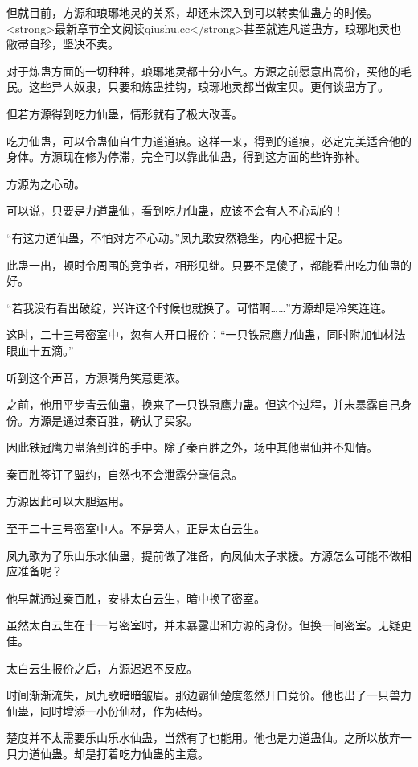 
\begin{this_body}

但就目前，方源和琅琊地灵的关系，却还未深入到可以转卖仙蛊方的时候。<strong>最新章节全文阅读qiushu.cc</strong>甚至就连凡道蛊方，琅琊地灵也敝帚自珍，坚决不卖。

对于炼蛊方面的一切种种，琅琊地灵都十分小气。方源之前愿意出高价，买他的毛民。这些异人奴隶，只要和炼蛊挂钩，琅琊地灵都当做宝贝。更何谈蛊方了。

但若方源得到吃力仙蛊，情形就有了极大改善。

吃力仙蛊，可以令蛊仙自生力道道痕。这样一来，得到的道痕，必定完美适合他的身体。方源现在修为停滞，完全可以靠此仙蛊，得到这方面的些许弥补。

方源为之心动。

可以说，只要是力道蛊仙，看到吃力仙蛊，应该不会有人不心动的！

“有这力道仙蛊，不怕对方不心动。”凤九歌安然稳坐，内心把握十足。

此蛊一出，顿时令周围的竞争者，相形见绌。只要不是傻子，都能看出吃力仙蛊的好。

“若我没有看出破绽，兴许这个时候也就换了。可惜啊……”方源却是冷笑连连。

这时，二十三号密室中，忽有人开口报价：“一只铁冠鹰力仙蛊，同时附加仙材法眼血十五滴。”

听到这个声音，方源嘴角笑意更浓。

之前，他用平步青云仙蛊，换来了一只铁冠鹰力蛊。但这个过程，并未暴露自己身份。方源是通过秦百胜，确认了买家。

因此铁冠鹰力蛊落到谁的手中。除了秦百胜之外，场中其他蛊仙并不知情。

秦百胜签订了盟约，自然也不会泄露分毫信息。

方源因此可以大胆运用。

至于二十三号密室中人。不是旁人，正是太白云生。

凤九歌为了乐山乐水仙蛊，提前做了准备，向凤仙太子求援。方源怎么可能不做相应准备呢？

他早就通过秦百胜，安排太白云生，暗中换了密室。

虽然太白云生在十一号密室时，并未暴露出和方源的身份。但换一间密室。无疑更佳。

太白云生报价之后，方源迟迟不反应。

时间渐渐流失，凤九歌暗暗皱眉。那边霸仙楚度忽然开口竞价。他也出了一只兽力仙蛊，同时增添一小份仙材，作为砝码。

楚度并不太需要乐山乐水仙蛊，当然有了也能用。他也是力道蛊仙。之所以放弃一只力道仙蛊。却是打着吃力仙蛊的主意。


\end{this_body}
